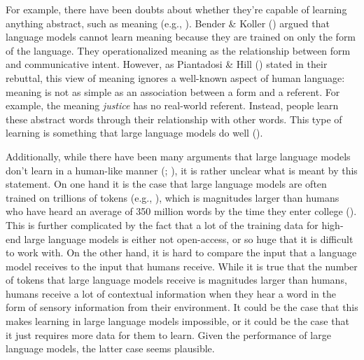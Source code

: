 \documentclass[
  12pt,
  letterpaper,
]{scrreprt}
\begin{document}
For example, there have been doubts about whether they're capable of
learning anything abstract, such as meaning (e.g.,
).
Bender \& Koller ()
argued that language models cannot learn meaning because they are
trained on only the form of the language. They operationalized meaning
as the relationship between form and communicative intent. However, as
Piantadosi \& Hill
() stated in
their rebuttal, this view of meaning ignores a well-known aspect of
human language: meaning is not as simple as an association between a
form and a referent. For example, the meaning \emph{justice} has no
real-world referent. Instead, people learn these abstract words through
their relationship with other words. This type of learning is something
that large language models do well
().

Additionally, while there have been many arguments that large language
models don't learn in a human-like manner
(;
), it
is rather unclear what is meant by this statement. On one hand it is the
case that large language models are often trained on trillions of tokens
(e.g., ), which is magnitudes larger than humans who have heard an
average of 350 million words by the time they enter college
(). This is further complicated by the fact that a lot of the
training data for high-end large language models is either not
open-access, or so huge that it is difficult to work with. On the other
hand, it is hard to compare the input that a language model receives to
the input that humans receive. While it is true that the number of
tokens that large language models receive is magnitudes larger than
humans, humans receive a lot of contextual information when they hear a
word in the form of sensory information from their environment. It could
be the case that this makes learning in large language models
impossible, or it could be the case that it just requires more data for
them to learn. Given the performance of large language models, the
latter case seems plausible.
\end{document}
